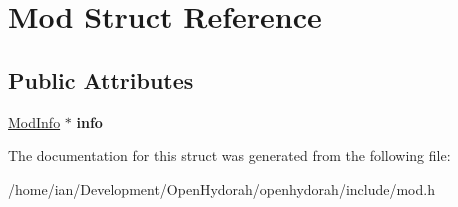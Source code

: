 \hypertarget{structMod}{\section{Mod Struct Reference}
\label{structMod}
}
\subsection*{Public Attributes}
\begin{DoxyCompactItemize}
\item 
\hypertarget{structMod_aa807c1c2fa9ec38f9ba4c8bf5a6f111a}{\hyperlink{structModInfo}{Mod\-Info} $\ast$ {\bfseries info}}\label{structMod_aa807c1c2fa9ec38f9ba4c8bf5a6f111a}

\end{DoxyCompactItemize}


The documentation for this struct was generated from the following file\-:\begin{DoxyCompactItemize}
\item 
/home/ian/\-Development/\-Open\-Hydorah/openhydorah/include/mod.\-h\end{DoxyCompactItemize}

